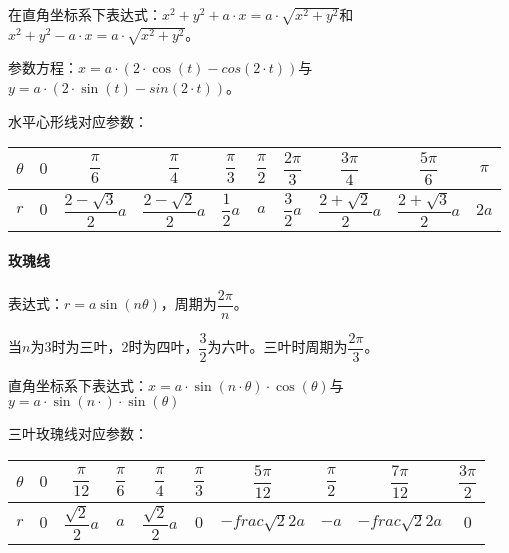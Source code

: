 \documentclass[UTF8, 12pt]{ctexart}
\begin{document}
在直角坐标系下表达式：$x^2+y^2+a\cdot x=a\cdot\sqrt{x^2+y^2}$和$x^2+y^2-a\cdot x=a\cdot\sqrt{x^2+y^2}$。

参数方程：$x=a\cdot(2\cdot\cos(t)-cos(2\cdot t))$与$y=a\cdot(2\cdot\sin(t)-sin(2\cdot t))$。

水平心形线对应参数： \leavevmode \medskip

\begin{tabular}{|c|c|c|c|c|c|c|c|c|c|}
    \hline
    $\theta$ & $0$ & $\dfrac{\pi}{6}$         & $\dfrac{\pi}{4}$         & $\dfrac{\pi}{3}$ & $\dfrac{\pi}{2}$ & $\dfrac{2\pi}{3}$ & $\dfrac{3\pi}{4}$        & $\dfrac{5\pi}{6}$        & $\pi$ \\ \hline
    $r$      & $0$ & $\dfrac{2-\sqrt{3}}{2}a$ & $\dfrac{2-\sqrt{2}}{2}a$ & $\dfrac{1}{2}a$  & $a$             & $\dfrac{3}{2}a$   & $\dfrac{2+\sqrt{2}}{2}a$ & $\dfrac{2+\sqrt{3}}{2}a$ & $2a$  \\
    \hline
\end{tabular}

\paragraph{玫瑰线} \leavevmode \medskip

\begin{minipage}{0.55\linewidth}
    表达式：$r=a\sin(n\theta)$，周期为$\dfrac{2\pi}{n}$。

    当$n$为3时为三叶，2时为四叶，$\dfrac{3}{2}$为六叶。三叶时周期为$\dfrac{2\pi}{3}$。

    直角坐标系下表达式：$x=a\cdot\sin(n\cdot\theta)\cdot\cos(\theta)$与$y=a\cdot\sin(n\cdot)\cdot\sin(\theta)$
\end{minipage}
\hfill
\begin{minipage}{0.35\linewidth}
\end{minipage}

三叶玫瑰线对应参数： \leavevmode \medskip

\begin{tabular}{|c|c|c|c|c|c|c|c|c|c|}
    \hline
    $\theta$ & $0$ & $\dfrac{\pi}{12}$      & $\dfrac{\pi}{6}$ & $\dfrac{\pi}{4}$       & $\dfrac{\pi}{3}$ & $\dfrac{5\pi}{12}$     & $\dfrac{\pi}{2}$ & $\dfrac{7\pi}{12}$     & $\dfrac{3\pi}{2}$ \\ \hline
    $r$      & $0$ & $\dfrac{\sqrt{2}}{2}a$ & $a$             & $\dfrac{\sqrt{2}}{2}a$ & $0$             & $-frac{\sqrt{2}}{2}a$ & $-a$            & $-frac{\sqrt{2}}{2}a$ & $0$              \\
    \hline
\end{tabular}
\end{document}
